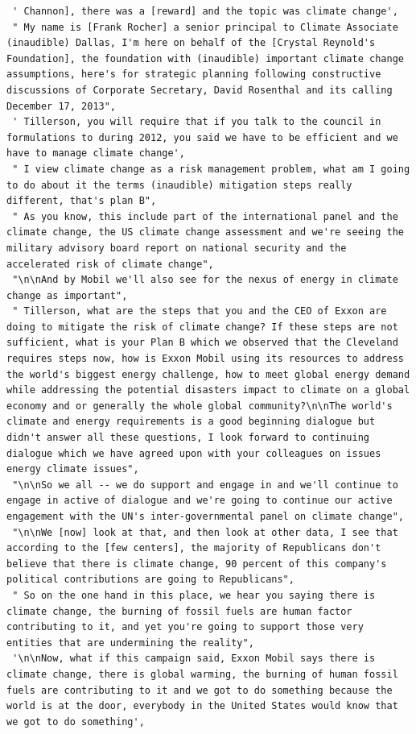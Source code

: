 \documentclass[
  letterpaper,
  DIV=11,
  numbers=noendperiod]{scrreprt}
\begin{document}
\begin{verbatim}
 ' Channon], there was a [reward] and the topic was climate change',
 " My name is [Frank Rocher] a senior principal to Climate Associate (inaudible) Dallas, I'm here on behalf of the [Crystal Reynold's Foundation], the foundation with (inaudible) important climate change assumptions, here's for strategic planning following constructive discussions of Corporate Secretary, David Rosenthal and its calling December 17, 2013",
 ' Tillerson, you will require that if you talk to the council in formulations to during 2012, you said we have to be efficient and we have to manage climate change',
 " I view climate change as a risk management problem, what am I going to do about it the terms (inaudible) mitigation steps really different, that's plan B",
 " As you know, this include part of the international panel and the climate change, the US climate change assessment and we're seeing the military advisory board report on national security and the accelerated risk of climate change",
 "\n\nAnd by Mobil we'll also see for the nexus of energy in climate change as important",
 " Tillerson, what are the steps that you and the CEO of Exxon are doing to mitigate the risk of climate change? If these steps are not sufficient, what is your Plan B which we observed that the Cleveland requires steps now, how is Exxon Mobil using its resources to address the world's biggest energy challenge, how to meet global energy demand while addressing the potential disasters impact to climate on a global economy and or generally the whole global community?\n\nThe world's climate and energy requirements is a good beginning dialogue but didn't answer all these questions, I look forward to continuing dialogue which we have agreed upon with your colleagues on issues energy climate issues",
 "\n\nSo we all -- we do support and engage in and we'll continue to engage in active of dialogue and we're going to continue our active engagement with the UN's inter-governmental panel on climate change",
 "\n\nWe [now] look at that, and then look at other data, I see that according to the [few centers], the majority of Republicans don't believe that there is climate change, 90 percent of this company's political contributions are going to Republicans",
 " So on the one hand in this place, we hear you saying there is climate change, the burning of fossil fuels are human factor contributing to it, and yet you're going to support those very entities that are undermining the reality",
 '\n\nNow, what if this campaign said, Exxon Mobil says there is climate change, there is global warming, the burning of human fossil fuels are contributing to it and we got to do something because the world is at the door, everybody in the United States would know that we got to do something',

\end{verbatim}
\end{document}
